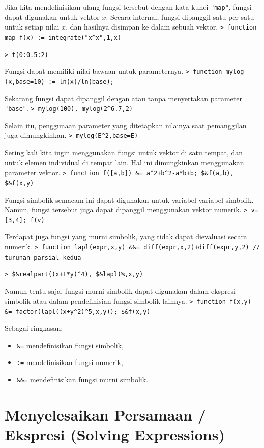 \documentclass[11pt, a4paper]{article}
\newcommand{\emtcmd}[1]{\noindent\texttt{\textcolor{emtcommand}{>}\ #1}\par\smallskip}
\begin{document}
Jika kita mendefinisikan ulang fungsi tersebut dengan kata kunci \texttt{"map"}, fungsi dapat digunakan untuk vektor $x$. Secara internal, fungsi dipanggil satu per satu untuk setiap nilai $x$, dan hasilnya disimpan ke dalam sebuah vektor.
\emtcmd{function map f(x) := integrate("x\^{}x",1,x)}
\emtcmd{f(0:0.5:2)}

Fungsi dapat memiliki nilai bawaan untuk parameternya.
\emtcmd{function mylog (x,base=10) := ln(x)/ln(base);}

Sekarang fungsi dapat dipanggil dengan atau tanpa menyertakan parameter \texttt{"base"}.
\emtcmd{mylog(100), mylog(2\^{}6.7,2)}

Selain itu, penggunaan parameter yang ditetapkan nilainya saat pemanggilan juga dimungkinkan.
\emtcmd{mylog(E\^{}2,base=E)}

Sering kali kita ingin menggunakan fungsi untuk vektor di satu tempat, dan untuk elemen individual di tempat lain. Hal ini dimungkinkan menggunakan parameter vektor.
\emtcmd{function f([a,b]) \&= a\^{}2+b\^{}2-a*b+b; \$\&f(a,b), \$\&f(x,y)}

Fungsi simbolik semacam ini dapat digunakan untuk variabel-variabel simbolik. Namun, fungsi tersebut juga dapat dipanggil menggunakan vektor numerik.
\emtcmd{v=[3,4]; f(v)}

Terdapat juga fungsi yang murni simbolik, yang tidak dapat dievaluasi secara numerik.
\emtcmd{function lapl(expr,x,y) \&\&= diff(expr,x,2)+diff(expr,y,2) \textcolor{emtcomment}{// turunan parsial kedua}}
\emtcmd{\$\&realpart((x+I*y)\^{}4), \$\&lapl(\%,x,y)}

Namun tentu saja, fungsi murni simbolik dapat digunakan dalam ekspresi simbolik atau dalam pendefinisian fungsi simbolik lainnya.
\emtcmd{function f(x,y) \&= factor(lapl((x+y\^{}2)\^{}5,x,y)); \$\&f(x,y)}

Sebagai ringkasan:
\begin{itemize}
    \item \texttt{\&=} mendefinisikan fungsi simbolik,
    \item \texttt{:=} mendefinisikan fungsi numerik,
    \item \texttt{\&\&=} mendefinisikan fungsi murni simbolik.
\end{itemize}

\section*{Menyelesaikan Persamaan / Ekspresi (Solving Expressions)}
\end{document}
